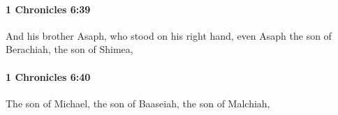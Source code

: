		\paragraph{1 Chronicles 6:39} %
			\label{1CHRONICLES-6-39}

			And his brother Asaph, who stood on his right hand, even Asaph the son of Berachiah, the son of Shimea,


		\paragraph{1 Chronicles 6:40} %
			\label{1CHRONICLES-6-40}

			The son of Michael, the son of Baaseiah, the son of Malchiah,


